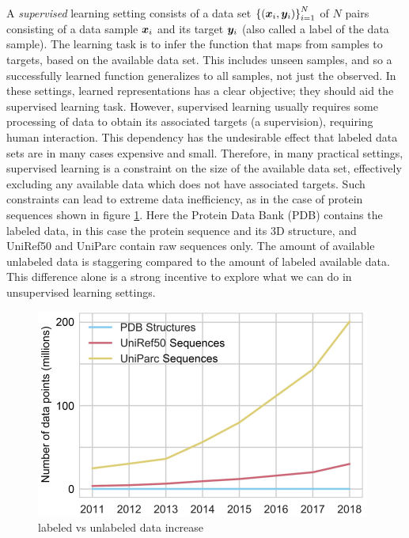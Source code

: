 A \textit{supervised} learning setting consists of a data set ${\mathopen{} \left\{ {\mathopen{} \left( \bm{ x }_i, \bm{ y }_i \right) \mathclose{}} \right\} \mathclose{}}^N_{i=1}$ of $N$ pairs consisting of a data sample $\bm{ x }_i$ and its target $\bm{ y }_i$ (also called a label of the data sample). The learning task is to infer the function that maps from samples to targets, based on the available data set. This includes unseen samples, and so a successfully learned function generalizes to all samples, not just the observed. In these settings, learned representations has a clear objective; they should aid the supervised learning task. However, supervised learning usually requires some processing of data to obtain its associated targets (a supervision), requiring human interaction. This dependency has the undesirable effect that labeled data sets are in many cases expensive and small. Therefore, in many practical settings, supervised learning is a constraint on the size of the available data set, effectively excluding any available data which does not have associated targets. Such constraints can lead to extreme data inefficiency, as in the case of protein sequences shown in figure \ref{fig:data_increase}. Here the Protein Data Bank (PDB) contains the labeled data, in this case the protein sequence and its 3D structure, and UniRef50 and UniParc contain raw sequences only. The amount of available unlabeled data is staggering compared to the amount of labeled available data. This difference alone is a strong incentive to explore what we can do in unsupervised learning settings. 

\begin{figure}[ht]
    \centering
    \includegraphics{report/figures/alt-fig.png}
    \caption{labeled vs unlabeled data increase }
    \label{fig:data_increase}
\end{figure}

